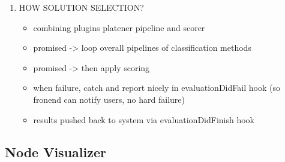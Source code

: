 \documentclass[../ClassicThesis.tex]{subfiles}
\begin{document}
\begin{enumerate}
\item HOW SOLUTION SELECTION?
  \begin{itemize}
  \item combining plugins platener pipeline and scorer
  \item promised -> loop overall pipelines of classification methods
  \item promised -> then apply scoring
  \item when failure, catch and report nicely in evaluationDidFail hook (so
    fronend can notify users, no hard failure)
  \item results pushed back to system via evaluationDidFinish hook
  \end{itemize}
\end{enumerate}

\subsection{Node Visualizer}
\end{document}
